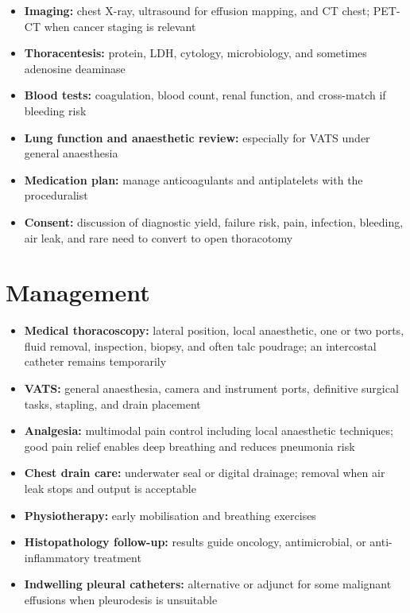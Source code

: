 \begin{itemize}
    \item \textbf{Imaging:} chest X-ray, ultrasound for effusion mapping, and CT chest; PET-CT when cancer staging is relevant
    \item \textbf{Thoracentesis:} protein, LDH, cytology, microbiology, and sometimes adenosine deaminase
    \item \textbf{Blood tests:} coagulation, blood count, renal function, and cross-match if bleeding risk
    \item \textbf{Lung function and anaesthetic review:} especially for VATS under general anaesthesia
    \item \textbf{Medication plan:} manage anticoagulants and antiplatelets with the proceduralist
    \item \textbf{Consent:} discussion of diagnostic yield, failure risk, pain, infection, bleeding, air leak, and rare need to convert to open thoracotomy
\end{itemize}

\section*{Management}
\begin{itemize}
    \item \textbf{Medical thoracoscopy:} lateral position, local anaesthetic, one or two ports, fluid removal, inspection, biopsy, and often talc poudrage; an intercostal catheter remains temporarily
    \item \textbf{VATS:} general anaesthesia, camera and instrument ports, definitive surgical tasks, stapling, and drain placement
    \item \textbf{Analgesia:} multimodal pain control including local anaesthetic techniques; good pain relief enables deep breathing and reduces pneumonia risk
    \item \textbf{Chest drain care:} underwater seal or digital drainage; removal when air leak stops and output is acceptable
    \item \textbf{Physiotherapy:} early mobilisation and breathing exercises
    \item \textbf{Histopathology follow-up:} results guide oncology, antimicrobial, or anti-inflammatory treatment
    \item \textbf{Indwelling pleural catheters:} alternative or adjunct for some malignant effusions when pleurodesis is unsuitable
\end{itemize}

